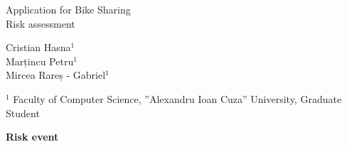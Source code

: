 \documentclass[a4paper]{article}
\begin{document}

\Large
 \begin{center}
Application for Bike Sharing\\ 
Risk assessment

\hspace{10pt}

\large
Cristian Hasna$^1$ \\
Marțincu Petru$^1$ \\
Mircea Rareș - Gabriel$^1$ \\

\hspace{10pt}

\small  
$^1$ Faculty of Computer Science, ”Alexandru Ioan Cuza” University, Graduate Student\\ 

\end{center}

\hspace{10pt}

\textbf{Risk event} \ \\

\normalsize
\end{document}

